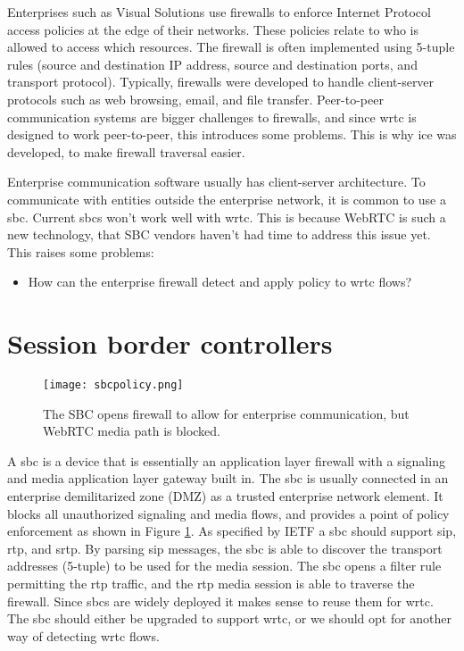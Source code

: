 Enterprises such as Visual Solutions use firewalls to enforce Internet Protocol access policies at the edge of their networks. These policies relate to who is allowed to access which resources. The firewall is often implemented using 5-tuple rules (source and destination IP address, source and destination ports, and transport protocol). Typically, firewalls were developed to handle client-server protocols such as web browsing, email, and file transfer\cite{johnston_taking_2013}. Peer-to-peer communication systems are bigger challenges to firewalls, and since \gls{wrtc} is designed to work peer-to-peer, this introduces some problems. This is why \gls{ice} was developed, to make firewall traversal easier. 

Enterprise communication software usually has client-server architecture. To communicate with entities outside the enterprise network, it is common to use a \gls{sbc}. Current \gls{sbc}s won't work well with \gls{wrtc}. This is because WebRTC is such a new technology, that SBC vendors haven't had time to address this issue yet. This raises some problems:

\begin{itemize}
\item{How can the enterprise firewall detect and apply policy to \gls{wrtc} flows?}
\end{itemize}

\section{Session border controllers}

\begin{figure}[here]
\centerline{\texttt{[image: sbcpolicy.png]}}
\caption{The SBC opens firewall to allow for enterprise communication, but WebRTC media path is blocked.}
\label{fig:sbc-policy}
\end{figure}

A \gls{sbc} is a device that is essentially an application layer firewall with a signaling and media application layer gateway built in. The \gls{sbc} is usually connected in an enterprise demilitarized zone (DMZ) as a trusted enterprise network element. It blocks all unauthorized signaling and media flows, and provides a point of policy enforcement as shown in Figure \ref{fig:sbc-policy}. As specified by IETF\cite{sbc} a \gls{sbc} should support \gls{sip}, \gls{rtp}, and \gls{srtp}. By parsing \gls{sip} messages, the \gls{sbc} is able to discover the transport addresses (5-tuple) to be used for the media session. The \gls{sbc} opens a filter rule permitting the \gls{rtp} traffic, and the \gls{rtp} media session is able to traverse the firewall. Since \gls{sbc}s are widely deployed it makes sense to reuse them for \gls{wrtc}. The \gls{sbc} should either be upgraded to support \gls{wrtc}, or we should opt for another way of detecting \gls{wrtc} flows.

